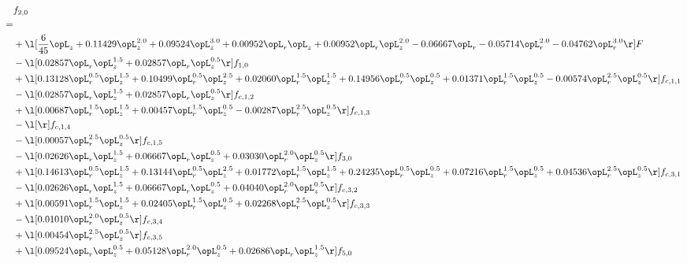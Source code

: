 \begin{alignat}{2} 
\label{eq:f_20_1} 
& f_{2,0} \nonumber \\ 
 = \\ 
& + \l[ \frac{6}{45} \opL_z +  0.11429 \opL_z^{2.0} +  0.09524 \opL_z^{3.0} +  0.00952 \opL_r \opL_z +  0.00952 \opL_r \opL_z^{2.0}   -0.06667 \opL_r   -0.05714 \opL_r^{2.0}   -0.04762 \opL_r^{3.0}  \r] F \nonumber \\ 
& - \l[  0.02857 \opL_r \opL_z^{1.5} +  0.02857 \opL_r \opL_z^{0.5}  \r] f_{1,0} \nonumber \\ 
& + \l[  0.13128 \opL_r^{0.5} \opL_z^{1.5} +  0.10499 \opL_r^{0.5} \opL_z^{2.5} +  0.02060 \opL_r^{1.5} \opL_z^{1.5} +  0.14956 \opL_r^{0.5} \opL_z^{0.5} +  0.01371 \opL_r^{1.5} \opL_z^{0.5}   -0.00574 \opL_r^{2.5} \opL_z^{0.5}  \r] f_{c,1,1} \nonumber \\ 
& - \l[  0.02857 \opL_r \opL_z^{1.5} +  0.02857 \opL_r \opL_z^{0.5}  \r] f_{c,1,2} \nonumber \\ 
& + \l[  0.00687 \opL_r^{1.5} \opL_z^{1.5} +  0.00457 \opL_r^{1.5} \opL_z^{0.5}   -0.00287 \opL_r^{2.5} \opL_z^{0.5}  \r] f_{c,1,3} \nonumber \\ 
& - \l[  \r] f_{c,1,4} \nonumber \\ 
& - \l[  0.00057 \opL_r^{2.5} \opL_z^{0.5}  \r] f_{c,1,5} \nonumber \\ 
& - \l[  0.02626 \opL_r \opL_z^{1.5} +  0.06667 \opL_r \opL_z^{0.5} +  0.03030 \opL_r^{2.0} \opL_z^{0.5}  \r] f_{3,0} \nonumber \\ 
& + \l[  0.14613 \opL_r^{0.5} \opL_z^{1.5} +  0.13144 \opL_r^{0.5} \opL_z^{2.5} +  0.01772 \opL_r^{1.5} \opL_z^{1.5} +  0.24235 \opL_r^{0.5} \opL_z^{0.5} +  0.07216 \opL_r^{1.5} \opL_z^{0.5} +  0.04536 \opL_r^{2.5} \opL_z^{0.5}  \r] f_{c,3,1} \nonumber \\ 
& - \l[  0.02626 \opL_r \opL_z^{1.5} +  0.06667 \opL_r \opL_z^{0.5} +  0.04040 \opL_r^{2.0} \opL_z^{0.5}  \r] f_{c,3,2} \nonumber \\ 
& + \l[  0.00591 \opL_r^{1.5} \opL_z^{1.5} +  0.02405 \opL_r^{1.5} \opL_z^{0.5} +  0.02268 \opL_r^{2.5} \opL_z^{0.5}  \r] f_{c,3,3} \nonumber \\ 
& - \l[  0.01010 \opL_r^{2.0} \opL_z^{0.5}  \r] f_{c,3,4} \nonumber \\ 
& + \l[  0.00454 \opL_r^{2.5} \opL_z^{0.5}  \r] f_{c,3,5} \nonumber \\ 
& + \l[  0.09524 \opL_r \opL_z^{0.5} +  0.05128 \opL_r^{2.0} \opL_z^{0.5} +  0.02686 \opL_r \opL_z^{1.5}  \r] f_{5,0} \nonumber \\ 

\end{alignat}
